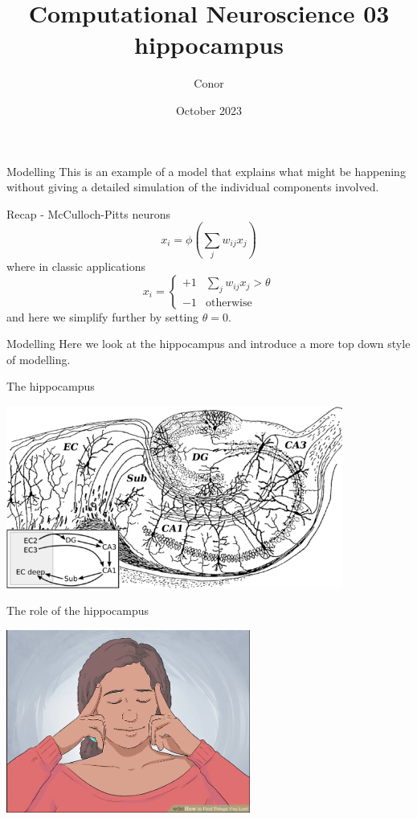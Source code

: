 \documentclass{beamer}
\title[Computational Neuroscience 03 hippocampus]{Computational Neuroscience 03 hippocampus}
\author{Conor}
\institute{\texttt{coms30127.github.io}}
\date{October 2023}
\begin{document}
\maketitle

\begin{frame}{Modelling}
This is an example of a model that explains what might be happening without giving a detailed simulation of the individual components involved.
  \end{frame}


\begin{frame}{Recap - McCulloch-Pitts neurons}
  \vskip 1cm
  $$
  x_i=\phi\left(\sum_j w_{ij}x_j\right)
  $$
  where in classic applications
  $$
  x_i=\left\{\begin{array}{cc}+1&\sum_j w_{ij}x_j>\theta\\-1&\mbox{otherwise}\end{array}\right.
  $$
  and here we simplify further by setting $\theta=0$.
\end{frame}

\begin{frame}{Modelling}
  Here we look at the hippocampus and introduce a more top down style
  of modelling.
\end{frame}
  
\begin{frame}{The hippocampus}
  \begin{center}
    \includegraphics[height=6cm]{hippocampus.png}
  \end{center}
      \vfill
\end{frame}

\begin{frame}{The role of the hippocampus}
  \begin{center}
    \includegraphics[height=6cm]{finding_lost_items.png}
  \end{center}
      \vfill
\end{frame}
\end{document}
